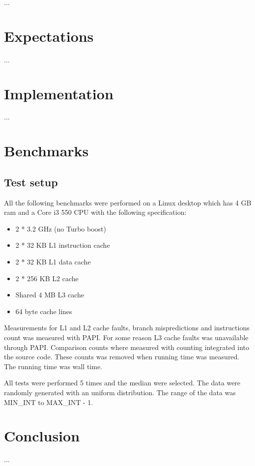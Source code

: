 \documentclass[a4paper]{article}
\begin{document}
...

\section{Expectations}

...

\section{Implementation}

...

\section{Benchmarks}

\subsection{Test setup}

All the following benchmarks were performed on a Linux desktop which has 4 GB ram and a Core i3 550 CPU with the following specification:

\begin{itemize}
\item 2 * 3.2 GHz (no Turbo boost)
\item 2 * 32 KB L1 instruction cache
\item 2 * 32 KB L1 data cache
\item 2 * 256 KB L2 cache
\item Shared 4 MB L3 cache
\item 64 byte cache lines
\end{itemize}

Measurements for L1 and L2 cache faults, branch mispredictions and instructions count was measured with PAPI. For some reason L3 cache faults was unavailable through PAPI. Comparison counts where measured with counting integrated into the source code. These counts was removed when running time was measured. The running time was wall time.


All tests were performed 5 times and the median were selected. The data were randomly generated with an uniform distribution. The range of the data was MIN\_INT to MAX\_INT - 1.



\section{Conclusion}

...
\end{document}
